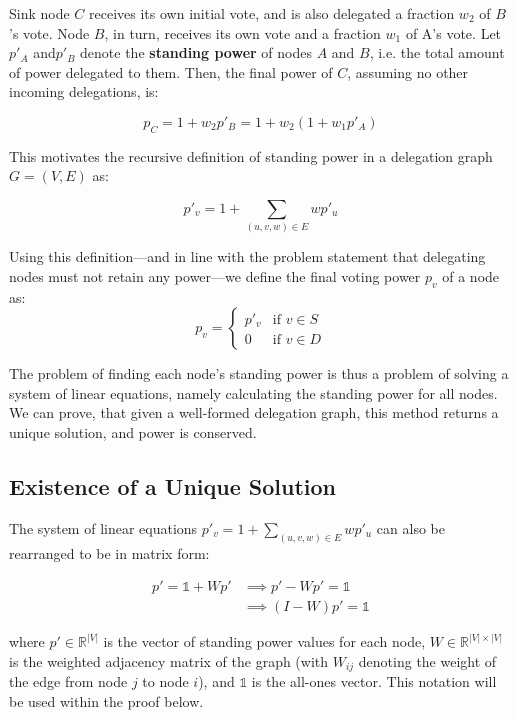 Sink node $C$ receives its own initial vote, and is also delegated a fraction $w_2$ of $B$'s vote. Node $B$, in turn, receives its own vote and a fraction $w_1$ of A's vote. Let $p'_A$ and$ p'_B$ denote the \textbf{standing power} of nodes $A$ and $B$, i.e. the total amount of power delegated to them. Then, the final power of $C$, assuming no other incoming delegations, is:

\[
p_C = 1 + w_2p'_B = 1 + w_2(1 + w_1p'_A)
\]

This motivates the recursive definition of standing power in a delegation graph $G = (V, E)$ as:

\[
p'_v = 1 + \sum_{(u, v, w) \in E} wp'_u
\]

Using this definition---and in line with the problem statement that delegating nodes must not retain any power---we define the final voting power $p_v$ of a node as:
\[
p_v = 
\begin{cases}
p'_v & \text{if } v \in S \\
0     & \text{if } v \in D
\end{cases}
\]

The problem of finding each node's standing power is thus a problem of solving a system of linear equations, namely calculating the standing power for all nodes. We can prove, that given a well-formed delegation graph, this method returns a unique solution, and power is conserved.

\subsection{Existence of a Unique Solution}
\label{subsec:unique_sol}

The system of linear equations $p'_v = 1 + \sum_{(u, v, w) \in E} wp'_u$ can also be rearranged to be in matrix form: 

\begin{align*}
p' = \mathbb{1} + Wp' &\implies p' - Wp' = \mathbb{1} \\
&\implies (I - W)p' = \mathbb{1}
\end{align*}

where \( p' \in \mathbb{R}^{|V|} \) is the vector of standing power values for each node, \( W \in \mathbb{R}^{|V| \times |V|} \) is the weighted adjacency matrix of the graph (with \( W_{ij} \) denoting the weight of the edge from node \( j \) to node \( i \)), and \( \mathbb{1} \) is the all-ones vector. This notation will be used within the proof below.

